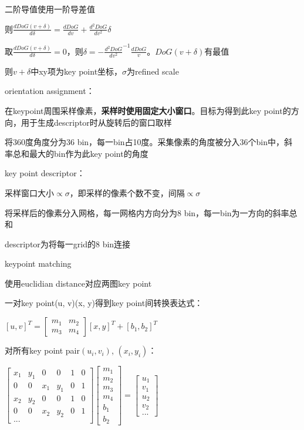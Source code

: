 \documentclass[UTF8]{ctexart}
\begin{document}
  \quad \quad \quad 二阶导值使用一阶导差值

  \quad \quad 则$\frac{dDoG(v + \delta)}{d\delta} = \frac{dDoG}{dv} + \frac{d^2DoG}{dv^2}\delta$

  \quad \quad 取$\frac{dDoG(v + \delta)}{d\delta} = 0$，则$\delta = -\frac{d^2DoG}{dv^2}^{-1}\frac{dDoG}{v}$。$DoG(v + \delta)$有最值

  \quad \quad 则$v + \delta$中xy项为key point坐标，$\sigma$为refined scale

  \quad orientation assignment：

  \quad \quad 在keypoint周围采样像素，\textbf{采样时使用固定大小窗口}。目标为得到此key point的方向，用于生成descriptor时从旋转后的窗口取样

  \quad \quad 将360度角度分为36 bin，每一bin占10度。采集像素的角度被分入36个bin中，斜率总和最大的bin作为此key point的角度

  \quad key point descriptor：

  \quad \quad 采样窗口大小$\propto \sigma$，即采样的像素个数不变，间隔$\propto \sigma$
  
  \quad \quad 将采样后的像素分入网格，每一网格内方向分为8 bin，每一bin为一方向的斜率总和

  \quad \quad descriptor为将每一grid的8 bin连接

  \quad keypoint matching

  \quad \quad 使用euclidian distance对应两图key point

  \quad \quad 一对key point(u, v)(x, y)得到key point间转换表达式：

  \quad \quad \quad $[u, v]^T = 
    \begin{bmatrix}
      m_1 & m_2 \\
      m_3 & m_4
      \end{bmatrix}
    [x, y]^T + [b_1, b_2]^T$

  \quad \quad \quad 对所有key point pair$(u_i, v_i)$, $(x_i, y_i)$：

  \quad \quad \quad $
    \begin{bmatrix}
      x_1 & y_1 & 0 & 0 & 1 & 0 \\
      0 & 0 & x_1 & y_1 & 0 & 1 \\
      x_2 & y_2 & 0 & 0 & 1 & 0 \\
      0 & 0 & x_2 & y_2 & 0 & 1 \\
      ... 
      \end{bmatrix}
    \begin{bmatrix}
      m_1 \\
      m_2 \\
      m_3 \\ 
      m_4 \\
      b_1 \\
      b_2
      \end{bmatrix}
    =
    \begin{bmatrix}
      u_1 \\
      v_1 \\
      u_2 \\ 
      v_2 \\
      ...
      \end{bmatrix}$
\end{document}
